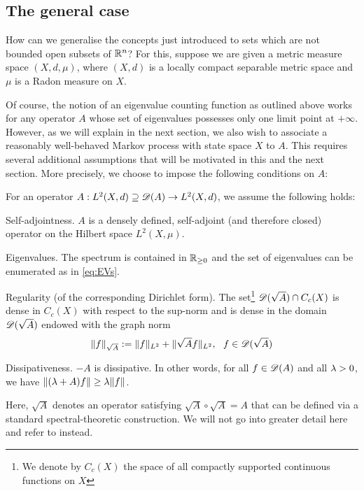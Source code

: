 \subsection{The general case}

How can we generalise the concepts just introduced to sets which are not bounded open subsets of $\mathbb{R}^n$? For this, suppose we are given a metric measure space 
$(X,d,\mu)$, where $(X,d)$ is a locally compact separable metric space and $\mu$ is a Radon measure on $X$.

Of course, the notion of an eigenvalue counting function as outlined above works for any operator $A$ whose set of eigenvalues possesses only one limit point at $+\infty$. However, as we will explain in the next section, we also wish to associate a reasonably well-behaved Markov process with state space $X$ to $A$. This requires several additional assumptions that will be motivated in this and the next section. More precisely, we choose to impose the following conditions on $A$:
\begin{cond}\label{cond:A}
For an operator $A:L^2(X,d)\supseteq\mathscr{D}(A)\to L^2(X,d)$, we assume the following holds:
\begin{compactdesc}
  \item[Self-adjointness.] $A$ is a densely defined, self-adjoint (and therefore closed) operator on the Hilbert space $L^2(X,\mu)$.
  \item[Eigenvalues.] The spectrum is contained in $\mathbb{R}_{\geq0}$ and the set of eigenvalues can be enumerated as in \eqref{eq:EVs}.
  \item[Regularity (of the corresponding Dirichlet form).] The set\footnote{We denote by $C_c(X)$ the space of all compactly supported continuous functions on $X$} $\mathscr{D}(\sqrt{A})\cap C_c(X)$ is dense in $C_c(X)$ with respect to the sup-norm and is dense in the domain $\mathscr{D}(\sqrt{A})$ endowed with the graph norm 
  \[
    \|f\|_{\sqrt{A}}:=\|f\|_{L^2}+\|\sqrt{A}f\|_{L^2},\ \ f\in\scD(\sqrt{A})
  \]
  \item[Dissipativeness.] $-A$ is dissipative. In other words, for all $f\in\mathscr{D}(A)$ and all $\lambda>0$, we have $\|(\lambda+A)f\|\geq\lambda\|f\|$.
\end{compactdesc}
\end{cond}
Here, $\sqrt{A}$ denotes an operator satisfying $\sqrt{A}\circ\sqrt{A}=A$ that can be defined via a standard spectral-theoretic construction. We will not go into greater detail here and refer to \cite{birman2012spectral} instead.


